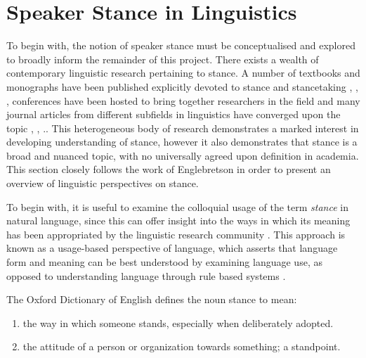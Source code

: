 \documentclass[Dissertation.tex]{subfiles}
\begin{document}
\section{Speaker Stance in Linguistics}\label{sec:speakerStanceLing}
To begin with, the notion of speaker stance must be conceptualised and explored to broadly inform the remainder of this project. There exists a wealth of contemporary linguistic research pertaining to stance. A number of textbooks and monographs have been published explicitly devoted to stance and stancetaking
\cite{hunstonEvaluationTextAuthorial2000}, \cite{englebretsonStancetakingDiscourseSubjectivity2007}, \cite{karkkainenEpistemicStanceEnglish2003}, 
%
conferences have been hosted to bring together researchers in the field
%
%
and  many journal articles from different subfields in linguistics have converged upon the topic \cite{biberStylesStanceEnglish1989}, \cite{wangCorpusbasedStudyStancetaking2018}, \cite{myersImpersonalYouStancetaking2012}.. This heterogeneous body of research demonstrates a marked interest in developing understanding of stance, however it also demonstrates that stance is a broad and nuanced topic, with no universally agreed upon definition in academia. This section closely follows the work of Englebretson \cite{englebretsonStancetakingDiscourseSubjectivity2007} in order to present an overview of linguistic perspectives on stance.

To begin with, it is useful to examine the colloquial usage of the term \textit{stance} in natural language, since this can offer insight into the ways in which its meaning has been appropriated by the linguistic research community \cite{englebretsonStancetakingDiscourseSubjectivity2007}. This approach is known as a usage-based perspective of language, which asserts that language form and meaning can be best understood by examining language use, as opposed to understanding language through rule based systems \cite{barlowUsagebasedModelsLanguage2000}. 

The Oxford Dictionary of English  \cite{StanceOxfordReference} defines the noun stance to mean:

\begin{displayquote}
	\begin{enumerate}
		\item the way in which someone stands, especially when deliberately adopted.
		\item the attitude of a person or organization towards something; a standpoint.
	\end{enumerate}
\end{displayquote}
\end{document}
